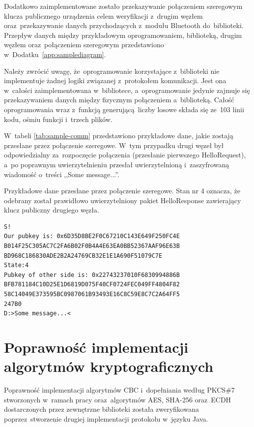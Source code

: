 Dodatkowo zaimplementowane zostało przekazywanie połączeniem szeregowym klucza publicznego urządzenia celem weryfikacji z~drugim węzłem oraz~przekazywanie danych przychodzących z~modułu Bluetooth do~biblioteki. Przepływ danych między przykładowym oprogramowaniem, biblioteką, drugim węzłem oraz~połączeniem szeregowym przedstawiono w~Dodatku~\ref{app:samplediagram}.

Należy zwrócić uwagę, że~oprogramowanie korzystające z~biblioteki nie implementuje żadnej logiki związanej z~protokołem komunikacji. Jest ona w~całości zaimplementowana w~bibliotece, a~oprogramowanie jedynie zajmuje się przekazywaniem danych między fizycznym połączeniem a~biblioteką. Całość oprogramowania wraz z~funkcją generującą liczby losowe składa się ze~103 linii kodu, ośmiu funkcji i~trzech plików.

W~tabeli \ref{tab:sample-comm} przedstawiono przykładowe dane, jakie zostają przesłane przez połączenie szeregowe. W~tym przypadku drugi węzeł był odpowiedzialny za~rozpoczęcie połączenia (przesłanie pierwszego HelloRequest), a~po poprawnym uwierzytelnieniu przesłał uwierzytelnioną i~zaszyfrowaną wiadomość o~treści ,,Some message...''.

\begin{table}
\centering
\caption{Przykładowe dane przesłane przez połączenie szeregowe. Stan nr 4 oznacza, że odebrany został prawidłowo uwierzytelniony pakiet HelloResponse zawierający klucz publiczny drugiego węzła.}
\begin{BVerbatim}
S!
Our pubkey is: 0x6D35D8BE2F0C67210C143E649F250FC4E
B014F25C305AC7C2FA6B02F0B4A4E63EA0BB52367AAF96E63B
BD968C186830ADE2B2A24769CB32E1E1A690F51079C7E
State:4
Pubkey of other side is: 0x22743237010F6830994886B
BFB781184C10D25E1D6819D075F40CF0724FEC049FF4804F82
58C14049E373595BC0987061B93493E16C8C59E8C7C2A64FF5
247B0
D:>Some message...<
\end{BVerbatim}
\label{tab:sample-comm}
\end{table}

\section{Poprawność implementacji algorytmów kryptograficznych}

Poprawność implementacji algorytmów CBC i~dopełniania według PKCS\#7 stworzonych w~ramach pracy oraz~algorytmów AES, SHA-256 oraz~ECDH dostarczonych przez zewnętrzne biblioteki została zweryfikowana poprzez~stworzenie drugiej implementacji protokołu w~języku Java.

